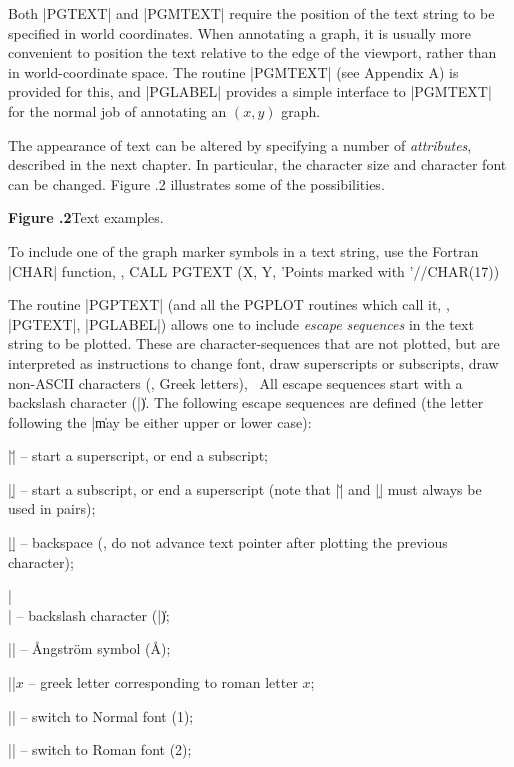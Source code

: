 Both |PGTEXT| and |PGMTEXT| require the position of the text string
to be specified in world coordinates.  When annotating a graph, it is 
usually more convenient to position the text relative to the edge of the
viewport, rather than in world-coordinate space.  The routine |PGMTEXT|
(see Appendix A) is provided for this, and |PGLABEL| provides a simple 
interface to |PGMTEXT| for the normal job of annotating an $(x,y)$ 
graph.

The appearance of text can be altered by specifying a number of {\it
attributes}, described in the next chapter.  In particular, the
character size and character font can be changed.  Figure \the\chapnum.2 
illustrates some of the possibilities.

\pageinsert
{}
\smallskip
\centerline{{\bf Figure \the\chapnum.2}\quad Text examples.}
\endinsert

To include one of the graph marker symbols in a text string, use the
Fortran |CHAR| function, \eg,
\begintt
CALL PGTEXT (X, Y, 'Points marked with '//CHAR(17))
\endtt

The routine |PGPTEXT| (and all the PGPLOT routines which call
it, \eg, |PGTEXT|, |PGLABEL|) allows one to include {\it escape 
sequences\/}
in the text string to be plotted. These are character-sequences that are
not plotted, but are interpreted as instructions to change font, draw
superscripts or subscripts, draw non-ASCII characters (\eg, Greek
letters), \etc\  All escape sequences start with a backslash character
(|\|). The following escape sequences are defined (the letter following
the |\| may be either upper or lower case): 

\noindent |\u| -- start a superscript, or end a subscript;

\noindent |\d| -- start a subscript, or end a superscript (note that
|\u| and |\d| must always be used in pairs); 

\noindent |\b| -- backspace (\ie, do not advance text pointer after
plotting the previous character);

\noindent |\\| -- backslash character (|\|);

\noindent |\A| -- \AA ngstr\"om symbol (\AA);

\noindent |\g|$x$ -- greek letter corresponding to roman letter $x$;

\noindent |\fn| -- switch to Normal font (1);

\noindent |\fr| -- switch to Roman font (2);

